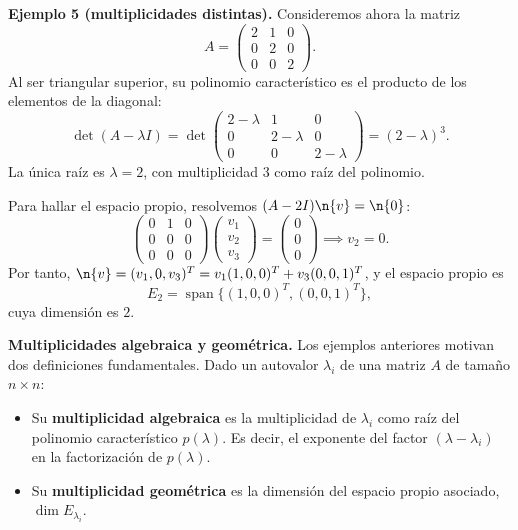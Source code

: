 \medskip

\noindent \textbf{Ejemplo 5 (multiplicidades distintas).} Consideremos ahora la matriz
\[
A = \begin{pmatrix} 2 & 1 & 0 \\ 0 & 2 & 0 \\ 0 & 0 & 2 \end{pmatrix}.
\]
Al ser triangular superior, su polinomio característico es el producto de los elementos de la diagonal:
\[
\det(A - \lambda I) = \det\begin{pmatrix} 2-\lambda & 1 & 0 \\ 0 & 2-\lambda & 0 \\ 0 & 0 & 2-\lambda \end{pmatrix} = (2-\lambda)^3.
\]
La única raíz es $\lambda = 2$, con multiplicidad $3$ como raíz del polinomio.

Para hallar el espacio propio, resolvemos $(A - 2I)\n{v} = \n{0}$:
\[
\begin{pmatrix} 0 & 1 & 0 \\ 0 & 0 & 0 \\ 0 & 0 & 0 \end{pmatrix} \begin{pmatrix} v_1 \\ v_2 \\ v_3 \end{pmatrix} = \begin{pmatrix} 0 \\ 0 \\ 0 \end{pmatrix}
\implies v_2 = 0.
\]
Por tanto, $\n{v} = (v_1, 0, v_3)^T = v_1(1,0,0)^T + v_3(0,0,1)^T$, y el espacio propio es
\[
E_2 = \operatorname{span}\{(1,0,0)^T, (0,0,1)^T\},
\]
cuya dimensión es $2$.

\medskip

\noindent \textbf{Multiplicidades algebraica y geométrica.} Los ejemplos anteriores motivan dos definiciones fundamentales. Dado un autovalor $\lambda_i$ de una matriz $A$ de tamaño $n\times n$:

\begin{itemize}
\item Su \textbf{multiplicidad algebraica} es la multiplicidad de $\lambda_i$ como raíz del polinomio característico $p(\lambda)$. Es decir, el exponente del factor $(\lambda - \lambda_i)$ en la factorización de $p(\lambda)$.
\item Su \textbf{multiplicidad geométrica} es la dimensión del espacio propio asociado, $\dim E_{\lambda_i}$.
\end{itemize}


